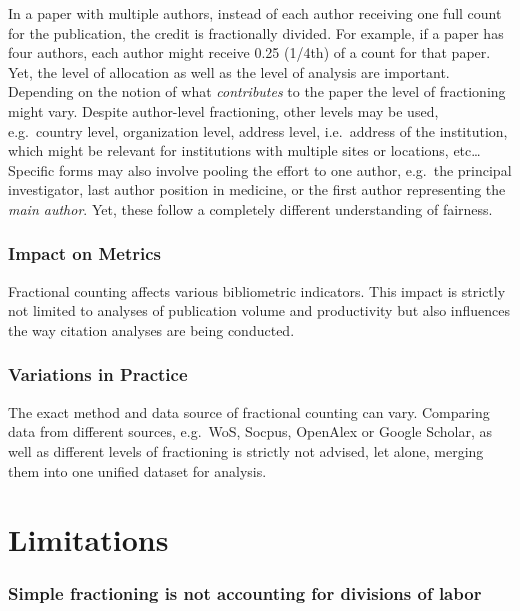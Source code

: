 \documentclass[
  letterpaper,
]{scrreprt}
\begin{document}
In a paper with multiple authors, instead of each author receiving one
full count for the publication, the credit is fractionally divided. For
example, if a paper has four authors, each author might receive 0.25
(1/4th) of a count for that paper. Yet, the level of allocation as well
as the level of analysis are important. Depending on the notion of what
\emph{contributes} to the paper the level of fractioning might vary.
Despite author-level fractioning, other levels may be used, e.g.~country
level, organization level, address level, i.e.~address of the
institution, which might be relevant for institutions with multiple
sites or locations, etc\ldots{} Specific forms may also involve pooling
the effort to one author, e.g.~the principal investigator, last author
position in medicine, or the first author representing the \emph{main
author}. Yet, these follow a completely different understanding of
fairness.

\subsubsection{Impact on Metrics}\label{impact-on-metrics}

Fractional counting affects various bibliometric indicators. This impact
is strictly not limited to analyses of publication volume and
productivity but also influences the way citation analyses are being
conducted.

\subsubsection{Variations in Practice}\label{variations-in-practice}

The exact method and data source of fractional counting can vary.
Comparing data from different sources, e.g.~WoS, Socpus, OpenAlex or
Google Scholar, as well as different levels of fractioning is strictly
not advised, let alone, merging them into one unified dataset for
analysis.

\section{Limitations}\label{limitations-7}

\subsubsection{Simple fractioning is not accounting for divisions of
labor}\label{simple-fractioning-is-not-accounting-for-divisions-of-labor}
\end{document}
